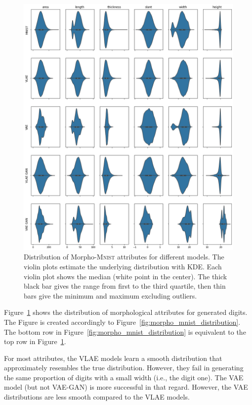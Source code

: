 \begin{figure}
    \centering
    \includegraphics[width=\textwidth]{images/generated_vs_true/mnist/morpho_distr.png}
    \caption[Distribution of Morpho-\textsc{Mnist} attributes for different models]{Distribution of Morpho-\textsc{Mnist} attributes for different models.
    The violin plots estimate the underlying distribution with \ac{KDE}.
    Each violin plot shows the median (white point in the center).
    The thick black bar gives the range from first to the third quartile, then thin bars give the minimum and maximum excluding outliers.}
    \label{fig:generated_morpho_distribution}
\end{figure}

Figure~\ref{fig:generated_morpho_distribution} shows the distribution of morphological attributes for generated digits.
The Figure is created accordingly to Figure~\ref{fig:morpho_mnist_distribution}.
The bottom row in Figure~\ref{fig:morpho_mnist_distribution} is equivalent to the top row in Figure~\ref{fig:generated_morpho_distribution}.

For most attributes, the \ac{VLAE} models learn a smooth distribution that approximately resembles the true distribution.
However, they fail in generating the same proportion of digits with a small width (i.e., the digit one).
The \ac{VAE} model (but not \ac{VAE}-\ac{GAN}) is more successful in that regard.
However, the \ac{VAE} distributions are less smooth compared to the \ac{VLAE} models.

